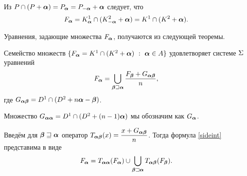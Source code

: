 Из $P\cap (P+{\bm{\alpha}})=P_{\bm{\alpha}}=P_{-{\bm{\alpha}}}+{\bm{\alpha}}$ следует, что 
\begin{equation}\label{eq:fbma}
F_{{\bm{\alpha}}}=K^1_{\bm{\alpha}}\cap(K^2_{-{\bm{\alpha}}}+{\bm{\alpha}})=K^1\cap(K^2+{\bm{\alpha}}).
\end{equation}


Уравнения, задающие множества $F_{\bm{\alpha}}$, получаются из следующей теоремы.

\begin{theorem}\label{IFC}
Семейство множеств $\{F_{\bm{\alpha}}=K^1\cap(K^2+{\bm{\alpha}})\ :\ {\bm{\alpha}}\in A\}$ удовлетворяет системе $\Sigma$ уравнений 
\begin{equation}\label{sideint}
F_{\bm{\alpha}}=\bigcup\limits_{{\bm{\beta}}\sqsupseteq{\bm{\alpha}}} 
\dfrac{F_{\bm{\beta}}+G_{{\bm{\alpha}}{\bm{\beta}}}}{n},
\end{equation}
где $G_{{\bm{\alpha}}{\bm{\beta}}}=D^1\cap(D^2+n{\bm{\alpha}}-{\bm{\beta}})$.
\end{theorem}

Множество $G_{{\bm{\alpha}}{\bm{\alpha}}}=D^1\cap(D^2+(n-1){\bm{\alpha}})$ мы обозначим как $G_{{\bm{\alpha}}}$.
\begin{remark}
Введём для ${\bm{\beta}}\sqsupseteq{\bm{\alpha}}$ оператор $T_{{\bm{\alpha}}{\bm{\beta}}}(x) = \dfrac{x+G_{{\bm{\alpha}}{\bm{\beta}}}}{n}$.
Тогда формула \eqref{sideint} представима в виде 
$$F_{{\bm{\alpha}}} = T_{{\bm{\alpha}}{\bm{\alpha}}}(F_{\bm{\alpha}}) \cup \bigcup_{{\bm{\beta}}\sqsupset{\bm{\alpha}}}T_{{\bm{\alpha}}{\bm{\beta}}}(F_{\bm{\beta}}).$$
\end{remark}

